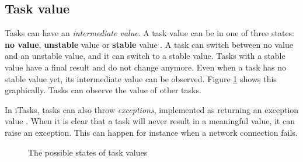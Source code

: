 

\subsection{Task value}\label{section-top-task-value}
Tasks can have an \textit{intermediate value}. A task value can be in one of three states: \textbf{no value}, \textbf{unstable} value or \textbf{stable} value \cite[\S 4.3]{achten2013introduction}. A task can switch between no value and an unstable value, and it can switch to a stable value. Tasks with a stable value have a final result and do not change anymore. Even when a task has no stable value yet, its intermediate value can be observed. Figure \ref{fig:task_states} shows this graphically. Tasks can observe the value of other tasks.

In iTasks, tasks can also throw \textit{exceptions}, implemented as returning an exception value \cite[\S 3.1.1]{plasmeijer2012task}. When it is clear that a task will never result in a meaningful value, it can raise an exception. This can happen for instance when a network connection fails.

\begin{figure}
    \centering
    \caption{The possible states of task values}
    \label{fig:task_states}
\end{figure}

